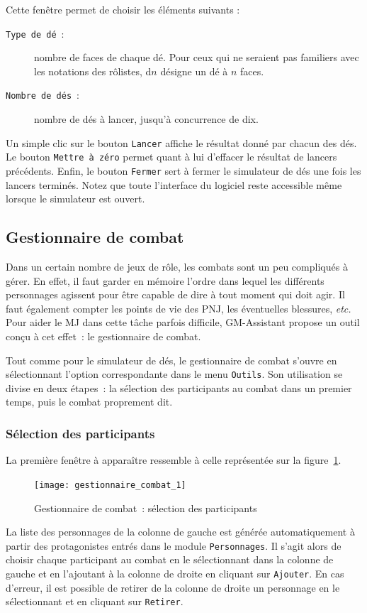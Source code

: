 \documentclass[a4paper,12pt]{article}
\newcommand*{\GMA}{GM-Assistant\xspace}
\newcommand*{\interfaceitem}[1]{\texttt{#1}}
\begin{document}
Cette fenêtre permet de choisir les éléments suivants :
\begin{description}
    \item[\interfaceitem{Type de dé}~:]{nombre de faces de chaque dé. Pour ceux qui ne seraient pas familiers avec les notations des rôlistes, d$n$ désigne un dé à $n$ faces.}
    \item[\interfaceitem{Nombre de dés}~:]{nombre de dés à lancer, jusqu'à concurrence de dix.}
\end{description}
Un simple clic sur le bouton \interfaceitem{Lancer} affiche le résultat donné par chacun des dés.
Le bouton \interfaceitem{Mettre à zéro} permet quant à lui d'effacer le résultat de lancers précédents.
Enfin, le bouton \interfaceitem{Fermer} sert à fermer le simulateur de dés une fois les lancers terminés.
Notez que toute l'interface du logiciel reste accessible même lorsque le simulateur est ouvert.

\subsection{Gestionnaire de combat}
\label{sec:combat}

Dans un certain nombre de jeux de rôle, les combats sont un peu compliqués à gérer.
En effet, il faut garder en mémoire l'ordre dans lequel les différents personnages agissent pour être capable de dire à tout moment qui doit agir.
Il faut également compter les points de vie des PNJ, les éventuelles blessures, \emph{etc.}
Pour aider le MJ dans cette tâche parfois difficile, \GMA propose un outil conçu à cet effet~: le gestionnaire de combat.

Tout comme pour le simulateur de dés, le gestionnaire de combat s'ouvre en sélectionnant l'option correspondante dans le menu \interfaceitem{Outils}.
Son utilisation se divise en deux étapes~: la sélection des participants au combat dans un premier temps, puis le combat proprement dit.

\subsubsection{Sélection des participants}

La première fenêtre à apparaître ressemble à celle représentée sur la figure~\ref{gestion_combat_choix}.
\begin{figure}[h]
    \texttt{[image: gestionnaire\_combat\_1]}
    \caption{Gestionnaire de combat~: sélection des participants}
    \label{gestion_combat_choix}
\end{figure}
La liste des personnages de la colonne de gauche est générée automatiquement à partir des protagonistes entrés dans le module \interfaceitem{Personnages}.
Il s'agit alors de choisir chaque participant au combat en le sélectionnant dans la colonne de gauche et en l'ajoutant à la colonne de droite en cliquant sur \interfaceitem{Ajouter}.
En cas d'erreur, il est possible de retirer de la colonne de droite un personnage en le sélectionnant et en cliquant sur \interfaceitem{Retirer}.
\end{document}
